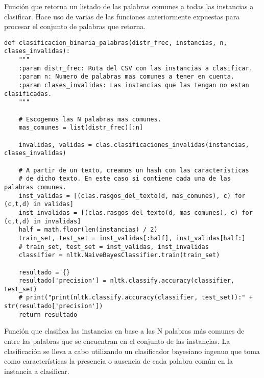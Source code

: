 Función que retorna un listado de las palabras comunes a todas las instancias a clasificar. Hace uso de varias de las funciones anteriormente expuestas para procesar el conjunto de palabras que retorna.

\begin{center}
\begin{minipage}{\linewidth}
\begin{lstlisting}[caption=Función que clasifica una instancia en base a las palabras comunes que contiene]
def clasificacion_binaria_palabras(distr_frec, instancias, n, clases_invalidas):
    """
    :param distr_frec: Ruta del CSV con las instancias a clasificar.
    :param n: Numero de palabras mas comunes a tener en cuenta.
    :param clases_invalidas: Las instancias que las tengan no estan clasificadas.
    """

    # Escogemos las N palabras mas comunes.
    mas_comunes = list(distr_frec)[:n]

    invalidas, validas = clas.clasificaciones_invalidas(instancias, clases_invalidas)

    # A partir de un texto, creamos un hash con las caracteristicas
    # de dicho texto. En este caso si contiene cada una de las palabras comunes.
    inst_validas = [(clas.rasgos_del_texto(d, mas_comunes), c) for (c,t,d) in validas]
    inst_invalidas = [(clas.rasgos_del_texto(d, mas_comunes), c) for (c,t,d) in invalidas]
    half = math.floor(len(instancias) / 2)
    train_set, test_set = inst_validas[:half], inst_validas[half:]
    # train_set, test_set = inst_validas, inst_invalidas
    classifier = nltk.NaiveBayesClassifier.train(train_set)

    resultado = {}
    resultado['precision'] = nltk.classify.accuracy(classifier, test_set)
    # print("print(nltk.classify.accuracy(classifier, test_set)):" + str(resultado['precision'])
    return resultado
\end{lstlisting}
\end{minipage}
\end{center}

Función que clasifica las instancias en base a las N palabras más comunes de entre las palabras que se encuentran en el conjunto de las instancias. La clasificación se lleva a cabo utilizando un clasificador bayesiano ingenuo que toma como características la presencia o ausencia de cada palabra común en la instancia a clasificar.

